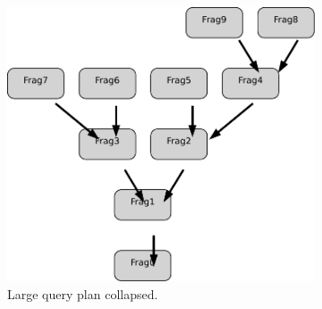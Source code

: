 \documentclass{chi2009}
\begin{document}
\begin{figure}[ht]
  \centering
  \begin{subfigure}[b]{0.49\columnwidth}
    \includegraphics[width=0.8\columnwidth]{images/graph_collapsed}
    \caption{Large query plan collapsed.}
    \label{fig:graph}
  \end{subfigure}
  \begin{subfigure}[b]{0.49\columnwidth}

\end{subfigure}
\end{figure}
\end{document}
